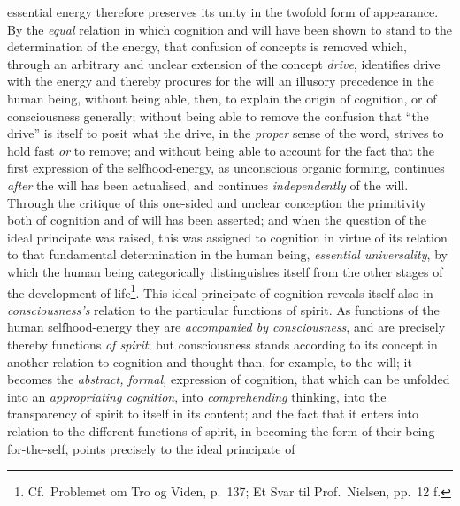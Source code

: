 \documentclass[12pt,a4paper]{book}
\begin{document}
essential energy therefore preserves its unity in the twofold form of
appearance. By the \emph{equal} relation in which cognition and will have been
shown to stand to the determination of the energy, that confusion of concepts
is removed which, through an arbitrary and unclear extension of the concept
\emph{drive}, identifies drive with the energy and thereby procures for the
will an illusory precedence in the human being, without being able, then, to
explain the origin of cognition, or of consciousness generally;
\setcounter{footnote}{0}%
without being able to remove the confusion that ``the drive'' is itself to
posit what the drive, in the \emph{proper} sense of the word, strives to hold
fast \emph{or} to remove; and without being able to account for the fact that
the first expression of the selfhood-energy, as unconscious organic forming,
continues \emph{after} the will has been actualised, and continues
\emph{independently} of the will. Through the critique of this one-sided and
unclear conception the primitivity both of cognition and of will has been
asserted; and when the question of the ideal principate was raised, this was
assigned to cognition in virtue of its relation to that fundamental
determination in the human being, \emph{essential universality}, by which the
human being categorically distinguishes itself from the other stages of the
development of life\footnote{Cf.\ Problemet om Tro og Viden, p.\ 137; Et Svar
til Prof.\ Nielsen, pp.\ 12 f.}.
This ideal principate of cognition reveals itself also in
\emph{consciousness's} relation to the particular functions of spirit. As
functions of the human selfhood-energy they are \emph{accompanied by
consciousness}, and are precisely thereby functions \emph{of spirit}; but
consciousness stands according to its concept in another relation to cognition
and thought than, for example, to the will; it becomes the \emph{abstract,
formal,} expression of cognition, that which can be unfolded into an
\emph{appropriating cognition}, into \emph{comprehending} thinking, into the
transparency of spirit to itself in its content; and the fact that it enters
into relation to the different functions of spirit, in becoming the form of
their being-for-the-self, points precisely to the ideal principate of
\end{document}
